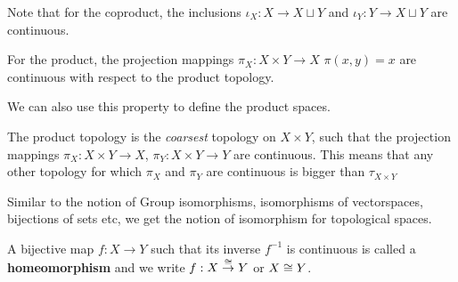 Note that for the coproduct, the inclusions $\iota_X: X \to X \sqcup Y$ and $\iota_Y: Y \to X \sqcup Y$ are continuous.

For the product, the projection mappings $\pi_X: X \times Y \to X$ $\pi(x,y) = x$ are continuous with respect to the product topology.

We can also use this property to define the product spaces.

The product topology is the \emph{coarsest} topology on $X \times Y$, such that the projection mappings $\pi_X: X \times Y \to X$, $\pi_Y: X \times Y \to Y$ are continuous. 
This means that any other topology for which $\pi_X$ and $\pi_Y$ are continuous is bigger than $\tau_{X \times Y}$


Similar to the notion of Group isomorphisms, isomorphisms of vectorspaces, bijections of sets etc, we get the notion of isomorphism for topological spaces.
\begin{dfn}[]
  A bijective map $f: X \to Y$ such that its inverse $f^{-1}$ is continuous is called a \textbf{homeomorphism} and we write $f: X \stackrel{\cong}{\to} Y$ or $X \cong Y$.
\end{dfn}



